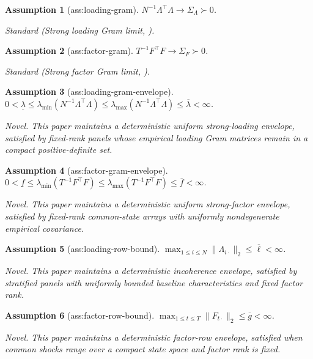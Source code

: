 \documentclass{article}
\newtheorem{assumption}{Assumption}
\begin{document}
\begin{assumption}[ass:loading-gram]\label{ass:loading-gram}
\(N^{-1}\Lambda^{\top}\Lambda\to\Sigma_{\Lambda}\succ0\).
\par\smallskip\noindent\emph{Standard} (Strong loading Gram limit, \cite{Bai2009}).
\end{assumption}

\begin{assumption}[ass:factor-gram]\label{ass:factor-gram}
\(T^{-1}F^{\top}F\to\Sigma_F\succ0\).
\par\smallskip\noindent\emph{Standard} (Strong factor Gram limit, \cite{Bai2009}).
\end{assumption}

\begin{assumption}[ass:loading-gram-envelope]\label{ass:loading-gram-envelope}
\(0<\underline\lambda\le\lambda_{\min}(N^{-1}\Lambda^{\top}\Lambda)\le\lambda_{\max}(N^{-1}\Lambda^{\top}\Lambda)\le\overline\lambda<\infty\).
\par\smallskip\noindent\emph{Novel.} This paper maintains a deterministic uniform strong-loading envelope, satisfied by fixed-rank panels whose empirical loading Gram matrices remain in a compact positive-definite set.
\end{assumption}

\begin{assumption}[ass:factor-gram-envelope]\label{ass:factor-gram-envelope}
\(0<\underline f\le\lambda_{\min}(T^{-1}F^{\top}F)\le\lambda_{\max}(T^{-1}F^{\top}F)\le\overline f<\infty\).
\par\smallskip\noindent\emph{Novel.} This paper maintains a deterministic uniform strong-factor envelope, satisfied by fixed-rank common-state arrays with uniformly nondegenerate empirical covariance.
\end{assumption}

\begin{assumption}[ass:loading-row-bound]\label{ass:loading-row-bound}
\(\max_{1\le i\le N}\|\Lambda_{i\cdot}\|_2\le\overline\ell<\infty\).
\par\smallskip\noindent\emph{Novel.} This paper maintains a deterministic incoherence envelope, satisfied by stratified panels with uniformly bounded baseline characteristics and fixed factor rank.
\end{assumption}

\begin{assumption}[ass:factor-row-bound]\label{ass:factor-row-bound}
\(\max_{1\le t\le T}\|F_{t\cdot}\|_2\le\overline g<\infty\).
\par\smallskip\noindent\emph{Novel.} This paper maintains a deterministic factor-row envelope, satisfied when common shocks range over a compact state space and factor rank is fixed.
\end{assumption}
\end{document}
